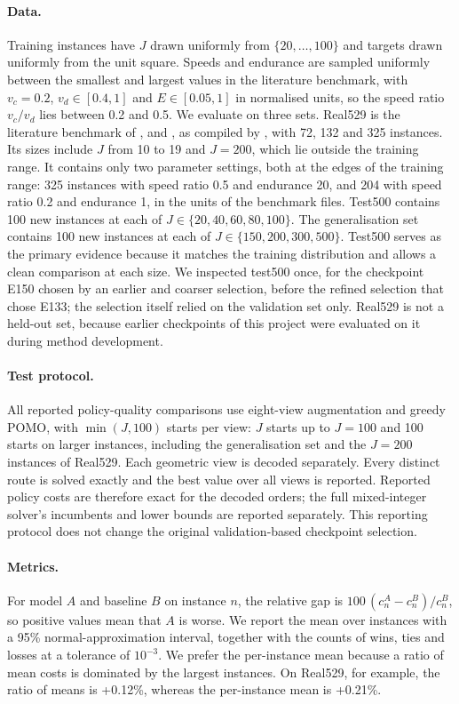 \documentclass[preprint,12pt,authoryear]{elsarticle}
\begin{document}
\paragraph{Data.} Training instances have $J$ drawn uniformly from $\{20,\dots,100\}$ and targets drawn uniformly from the unit square. Speeds and endurance are sampled uniformly between the smallest and largest values in the literature benchmark, with $v_{c} = 0.2$, $v_{d} \in [0.4, 1]$ and $E \in [0.05, 1]$ in normalised units, so the speed ratio $v_{c}/v_{d}$ lies between 0.2 and 0.5. We evaluate on three sets. Real529 is the literature benchmark of \citet{gambella2018}, \citet{erdogan2021} and \citet{poikonen2020}, as compiled by \citet{li2025}, with 72, 132 and 325 instances. Its sizes include $J$ from 10 to 19 and $J = 200$, which lie outside the training range. It contains only two parameter settings, both at the edges of the training range: 325 instances with speed ratio 0.5 and endurance 20, and 204 with speed ratio 0.2 and endurance 1, in the units of the benchmark files. Test500 contains 100 new instances at each of $J \in \{20,40,60,80,100\}$. The generalisation set contains 100 new instances at each of $J \in \{150,200,300,500\}$. Test500 serves as the primary evidence because it matches the training distribution and allows a clean comparison at each size. We inspected test500 once, for the checkpoint E150 chosen by an earlier and coarser selection, before the refined selection that chose E133; the selection itself relied on the validation set only. Real529 is not a held-out set, because earlier checkpoints of this project were evaluated on it during method development.

\paragraph{Test protocol.} All reported policy-quality comparisons use eight-view augmentation and greedy POMO, with $\min(J,100)$ starts per view: $J$ starts up to $J = 100$ and 100 starts on larger instances, including the generalisation set and the $J = 200$ instances of Real529. Each geometric view is decoded separately. Every distinct route is solved exactly and the best value over all views is reported. Reported policy costs are therefore exact for the decoded orders; the full mixed-integer solver's incumbents and lower bounds are reported separately. This reporting protocol does not change the original validation-based checkpoint selection.

\paragraph{Metrics.} For model $A$ and baseline $B$ on instance $n$, the relative gap is $100\,(c^{A}_{n} - c^{B}_{n})/c^{B}_{n}$, so positive values mean that $A$ is worse. We report the mean over instances with a 95\% normal-approximation interval, together with the counts of wins, ties and losses at a tolerance of $10^{-3}$. We prefer the per-instance mean because a ratio of mean costs is dominated by the largest instances. On Real529, for example, the ratio of means is +0.12\%, whereas the per-instance mean is +0.21\%.
\end{document}
